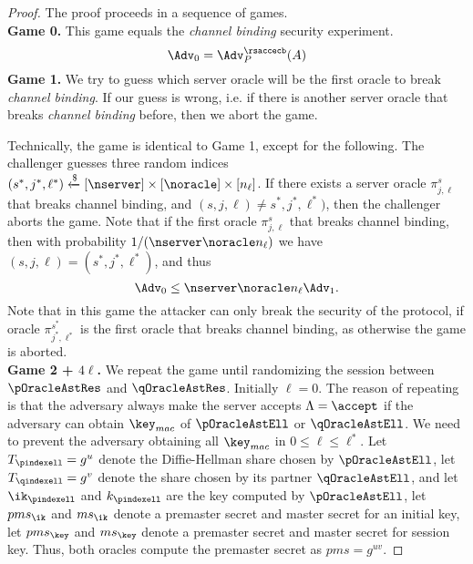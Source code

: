 \begin{proof}
 The proof proceeds in a sequence of games. \vspace{10pt}\\
 \textbf{Game 0.} This game equals the \textit{channel binding} security experiment.
 \begin{equation}
  \Adv_0 = \Adv^{\rsaccecb}_{P}(A)
 \end{equation}%
%
%
 \textbf{Game 1.} We try to guess which server oracle will be the first oracle to break \textit{channel binding}. If our guess is wrong, i.e. if there is another server oracle that breaks \textit{channel binding} before, then we abort the game.

 Technically, the game is identical to Game 1, except for the following. The challenger guesses three random indices $(s^{\ast}, j^{\ast}, \ell^{\ast}) \xleftarrow{\$} [\nserver] \times [\noracle] \times [n_{\ell}]$. If there exists a server oracle $\pi^s_{j,\ell}$ that breaks channel binding, and $(s, j, \ell) \neq s^{\ast}, j^{\ast}, \ell^{\ast})$, then the challenger aborts the game. Note that if the first oracle $\pi^s_{j,\ell}$ that breaks channel binding, then with probability $1/(\nserver \noracle n_{\ell})$ we have $(s,j,\ell) = (s^{\ast}, j^{\ast}, \ell^{\ast})$, and thus
 \begin{equation}
  \Adv_0 \leq \nserver \noracle n_{\ell} \Adv_1.
 \end{equation}%
 Note that in this game the attacker can only break the security of the protocol, if oracle $\pi^{s^{\ast}}_{j^{\ast},\ell^{\ast}}$ is the first oracle that breaks channel binding, as otherwise the game is aborted.
\vspace{10pt}\\%
%
%
 \textbf{Game 2 + $4\ell$.} We repeat the game until randomizing the session between $\pOracleAstRes$ and $\qOracleAstRes$. Initially $\ell = 0$. The reason of repeating is that the adversary always make the server accepts $\Lambda = \accept$ if the adversary can obtain $\key_{mac}$ of $\pOracleAstEll$ or $\qOracleAstEll$. We need to prevent the adversary obtaining all $\key_{mac}$ in $ 0 \leq \ell \leq \ell^{\ast}$.
 Let $T_{\pindexell} = g^u$ denote the Diffie-Hellman share chosen by $\pOracleAstEll$, let $T_{\qindexell} = g^v$ denote the share chosen by its partner $\qOracleAstEll$, and let $\ik_{\pindexell}$ and $k_{\pindexell}$ are the key computed by $\pOracleAstEll$, let $pms_{\ik}$ and $ms_{\ik}$ denote a premaster secret and master secret for an initial key, let $pms_{\key}$ and $ms_{\key}$ denote a premaster secret and master secret for session key. Thus, both oracles compute the premaster secret as $pms = g^{uv}$.


\end{proof}
